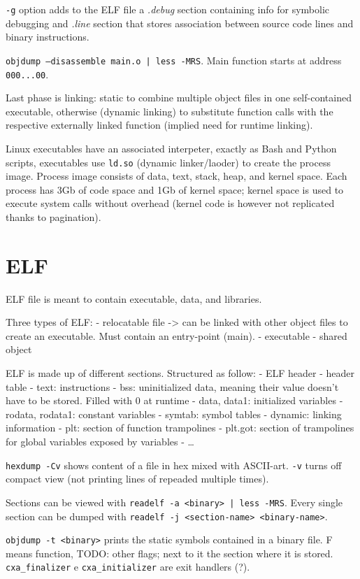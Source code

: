 \texttt{-g} option adds to the ELF file a \textit{.debug} section containing info for symbolic debugging and \textit{.line} section that stores association between source code lines and binary instructions.

\texttt{objdump --disassemble main.o | less -MRS}. Main function starts at address \texttt{000...00}.

Last phase is linking: static to combine multiple object files in one self-contained executable, otherwise (dynamic linking) to substitute function calls with the respective externally linked function (implied need for runtime linking).

Linux executables have an associated interpeter, exactly as Bash and Python scripts, executables use \texttt{ld.so} (dynamic linker/laoder) to create the process image.
Process image consists of data, text, stack, heap, and kernel space.
Each process has 3Gb of code space and 1Gb of kernel space; kernel space is used to execute system calls without overhead (kernel code is however not replicated thanks to pagination).

\section{ELF}
ELF file is meant to contain executable, data, and libraries.

Three types of ELF:
- relocatable file -> can be linked with other object files to create an executable. Must contain an entry-point (main).
- executable
- shared object

ELF is made up of different sections. Structured as follow:
- ELF header
- header table
- text: instructions
- bss: uninitialized data, meaning their value doesn't have to be stored. Filled with 0 at runtime
- data, data1: initialized variables
- rodata, rodata1: constant variables
- symtab: symbol tables
- dynamic: linking information
- plt: section of function trampolines
- plt.got: section of trampolines for global variables exposed by variables
- \dots

\texttt{hexdump -Cv} shows content of a file in hex mixed with ASCII-art. \texttt{-v} turns off compact view (not printing lines of repeaded multiple times).

Sections can be viewed with \texttt{readelf -a <binary> | less -MRS}. Every single section can be dumped with \texttt{readelf -j <section-name> <binary-name>}.

\texttt{objdump -t <binary>} prints the static symbols contained in a binary file. F means function, TODO: other flags; next to it the section where it is stored. \texttt{cxa_finalizer} e \texttt{cxa_initializer} are exit handlers (?).

